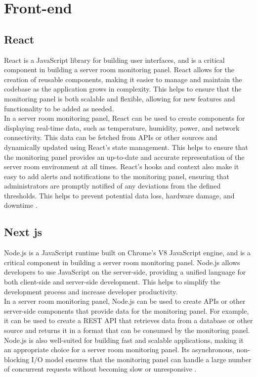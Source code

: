 \section{Front-end}
    \subsection{React}
    React is a JavaScript library for building user interfaces, and is a critical component in building a server room monitoring panel. React allows for the creation of reusable components, making it easier to manage and maintain the codebase as the application grows in complexity. This helps to ensure that the monitoring panel is both scalable and flexible, allowing for new features and functionality to be added as needed.\\
    In a server room monitoring panel, React can be used to create components for displaying real-time data, such as temperature, humidity, power, and network connectivity. This data can be fetched from APIs or other sources and dynamically updated using React's state management. This helps to ensure that the monitoring panel provides an up-to-date and accurate representation of the server room environment at all times. React's hooks and context also make it easy to add alerts and notifications to the monitoring panel, ensuring that administrators are promptly notified of any deviations from the defined thresholds. This helps to prevent potential data loss, hardware damage, and downtime \cite{react}.
    \subsection{Next js}
    Node.js is a JavaScript runtime built on Chrome's V8 JavaScript engine, and is a critical component in building a server room monitoring panel. Node.js allows developers to use JavaScript on the server-side, providing a unified language for both client-side and server-side development. This helps to simplify the development process and increase developer productivity.\\
    In a server room monitoring panel, Node.js can be used to create APIs or other server-side components that provide data for the monitoring panel. For example, it can be used to create a REST API that retrieves data from a database or other source and returns it in a format that can be consumed by the monitoring panel.\\
    Node.js is also well-suited for building fast and scalable applications, making it an appropriate choice for a server room monitoring panel. Its asynchronous, non-blocking I/O model ensures that the monitoring panel can handle a large number of concurrent requests without becoming slow or unresponsive \cite{nextjs}.

